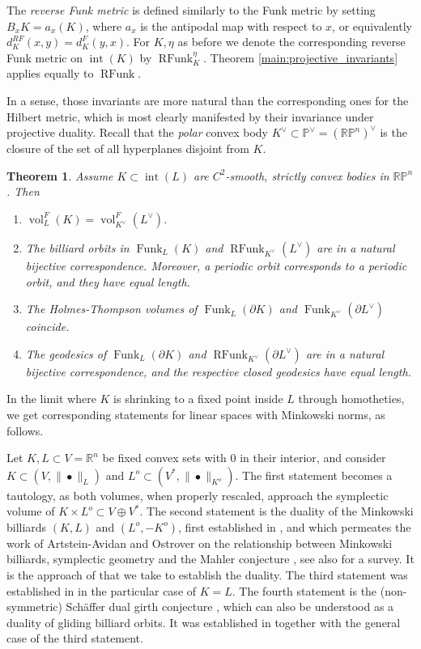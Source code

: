 \documentclass[reqno,10pt]{amsart}
\newcounter{mt}
\newcounter{mp}
\newtheorem{MainTheorem}[mt]{Theorem}
\DeclareMathOperator{\inter}{int}
\DeclareMathOperator{\vol}{vol}
\DeclareMathOperator{\Funk}{Funk}
\DeclareMathOperator{\RFunk}{RFunk}
\newcommand{\R}{\mathbb{R}}
\newcommand{\PP}{\mathbb{P}}
\begin{document}
The \emph{reverse Funk metric} is defined similarly to the Funk metric by setting $B_xK=a_x(K)$, where $a_x$ is the antipodal map with respect to $x$, or equivalently $d_K^{RF}(x,y)=d_K^F(y,x)$. For $K, \eta$ as before we denote the corresponding reverse Funk metric on $\inter(K)$ by $\RFunk_K^\eta$. Theorem \ref{main:projective_invariants} applies equally to $\RFunk$.

In a sense, those invariants are more natural than the corresponding ones for the Hilbert metric, which is most clearly manifested by their invariance under projective duality. Recall that the \emph{polar} convex body $K^\vee\subset \PP^\vee=(\R\mathbb P^n)^\vee$ is the closure of the set of all hyperplanes disjoint from $K$.

\begin{MainTheorem}\label{main:duality} Assume $K\subset \inter(L)$ are $C^2$-smooth, strictly convex bodies in $\R\PP^n$.
	Then 	\begin{enumerate}
		\item  $\vol^F_L(K)=\vol^{F}_{K^\vee}(L^\vee)$.
		\item The billiard orbits in $\Funk_L(K)$ and $\RFunk_{K^\vee}(L^\vee)$ are in a natural bijective correspondence. Moreover, a periodic orbit corresponds to a periodic orbit, and they have equal length.
		\item The Holmes-Thompson volumes of $\Funk_L(\partial K)$ and $\Funk_{K^\vee}(\partial L^\vee)$ coincide.
		\item The geodesics of $\Funk_L(\partial K)$ and $\RFunk_{K^\vee}(\partial L^\vee)$ are in a natural bijective correspondence, and the respective closed geodesics have equal length.
	\end{enumerate}
\end{MainTheorem}

In the limit where $K$ is shrinking to a fixed point inside $L$ through homotheties, we get corresponding statements for linear spaces with Minkowski norms, as follows. 

Let $K, L\subset V=\R^n$ be fixed convex sets with $0$ in their interior, and consider $K\subset (V, \|\bullet\|_L)$ and $L^o\subset (V^*, \|\bullet\|_{K^o})$. The first statement becomes a tautology, as both volumes, when properly rescaled, approach the symplectic volume of $K\times L^o\subset V\oplus V^*$.
The second statement is the duality of the Minkowski billiards $(K, L)$ and $(L^o,-K^o)$, first established in \cite{gutkin_tabachnikov}, and which permeates the work of Artstein-Avidan and Ostrover on the relationship between Minkowski billiards, symplectic geometry and the Mahler conjecture \cite{artstein_ostrover, artstein_karasev_ostrover}, see also \cite{ostrover} for a survey. It is the approach of \cite{artstein_ostrover} that we take to establish the duality.
The third statement was established in \cite{holmes_thompson} in the particular case of $K=L$. The fourth statement is the (non-symmetric) Sch\"affer dual girth conjecture \cite{schaeffer}, which can also be understood as a duality of gliding billiard orbits. It was established in \cite{alvarez-paiva} together with the general case of the third statement.
\end{document}
